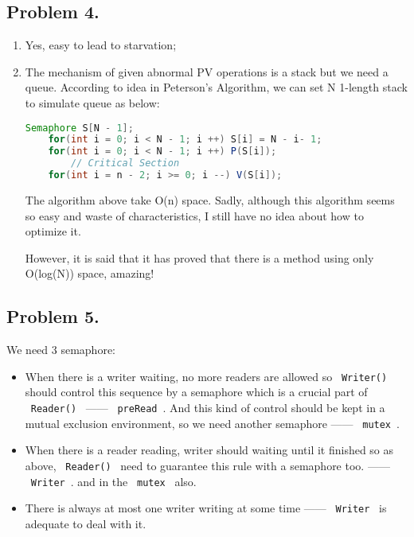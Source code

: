 \documentclass[11pt]{article}
\begin{document}
\subsection*{Problem 4. }
\begin{enumerate}
    \item Yes, easy to lead to starvation; 
    \item The mechanism of given abnormal PV operations is a stack but we need a queue. According to idea in Peterson's Algorithm, 
        we can set N 1-length stack to simulate queue as below:

\begin{lstlisting}[language = Java]
    Semaphore S[N - 1];
    for(int i = 0; i < N - 1; i ++) S[i] = N - i- 1;
	for(int i = 0; i < N - 1; i ++) P(S[i]);
	    // Critical Section
	for(int i = n - 2; i >= 0; i --) V(S[i]);
\end{lstlisting}

The algorithm above take O(n) space. 
Sadly, although this algorithm seems so easy and waste of characteristics, I still have no idea about how to optimize it.

However, it is said that it has proved that there is a method using only O(log(N)) space, amazing!
\end{enumerate}

\subsection*{Problem 5. }
We need 3 semaphore:
\begin{itemize}
    \item When there is a writer waiting, no more readers are allowed 
        so ~\lstinline{Writer()}~ should control this sequence by a semaphore which is a crucial part of ~\lstinline{Reader()}~ —— ~\lstinline{preRead}~.
        And this kind of control should be kept in a mutual exclusion environment, so we need another semaphore —— ~\lstinline{mutex}~.
    \item When there is a reader reading, writer should waiting until it finished 
    so as above, ~\lstinline{Reader()}~ need to guarantee this rule with a semaphore too. —— ~\lstinline{Writer}~.
    and in the ~\lstinline{mutex}~ also.
    \item There is always at most one writer writing at some time —— ~\lstinline{Writer}~ is adequate to deal with it.
\end{itemize}
\end{document}
